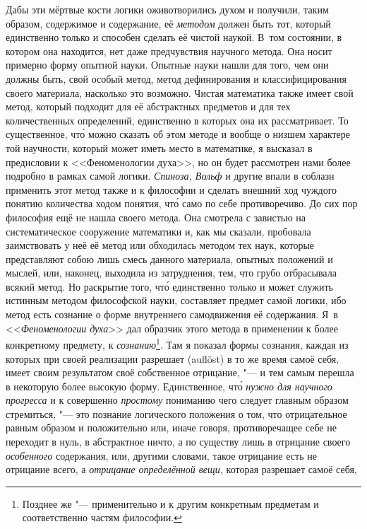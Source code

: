 Дабы эти мёртвые кости логики оживотворились духом и получили, таким
образом, содержимое и содержание, её {\em методом}
должен быть тот, который единственно только и способен сделать её чистой
наукой. В~том состоянии, в котором она находится, нет даже предчувствия
научного метода. Она носит примерно форму опытной науки. Опытные науки
нашли для того, чем они должны быть, свой особый метод, метод дефинирования
и классифицирования своего материала, насколько это возможно. Чистая
математика также имеет свой метод, который подходит для её абстрактных
предметов и для тех количественных определений, единственно в которых она
их рассматривает. То существенное, чт\'{о} можно сказать об этом методе и
вообще о низшем характере той научности, который может иметь место в
математике, я высказал в предисловии к <<Феноменологии духа>>, но он будет
рассмотрен нами более подробно в рамках самой логики.
{\em Спиноза, Вольф} и другие
впали в соблазн применить этот метод также и к философии и сделать внешний
ход чуждого понятию количества ходом понятия, чт\'{о} само по себе
противоречиво. До сих пор философия ещё не нашла своего метода. Она
смотрела с завистью на систематическое сооружение математики и, как мы
сказали, пробовала заимствовать у неё её метод или обходилась методом тех
наук, которые представляют собою лишь смесь данного материала, опытных
положений и мыслей, или, наконец, выходила из затруднения, тем, что грубо
отбрасывала всякий метод. Но раскрытие того, чт\'{о} единственно только и может
служить истинным методом философской науки, составляет предмет самой
логики, ибо метод есть сознание о форме внутреннего самодвижения её
содержания. Я~в <<{\em Феноменологии духа}>> дал образчик
этого метода в применении к более конкретному предмету, к
{\em сознанию}\footnote{Позднее же "--- применительно
и к другим конкретным предметам и соответственно частям философии.}.
Там я показал формы сознания, каждая из которых при своей реализации разрешает
(auf\-löst) в то же время самоё себя, имеет своим результатом своё собственное
отрицание, "--- и тем самым перешла в некоторую более высокую форму.
Единственное, чт\'{о} {\em нужно для научного прогресса} и к совершенно
{\em простому} пониманию чего следует главным образом стремиться, "--- это
познание логического положения о том, что отрицательное равным образом и
положительно или, иначе говоря, противоречащее себе не переходит в нуль,
в абстрактное ничто, а по существу лишь в отрицание своего {\em особенного}
содержания, или, другими словами, такое отрицание есть не отрицание всего,
а {\em отрицание определённой вещи,} которая разрешает самоё себя,
